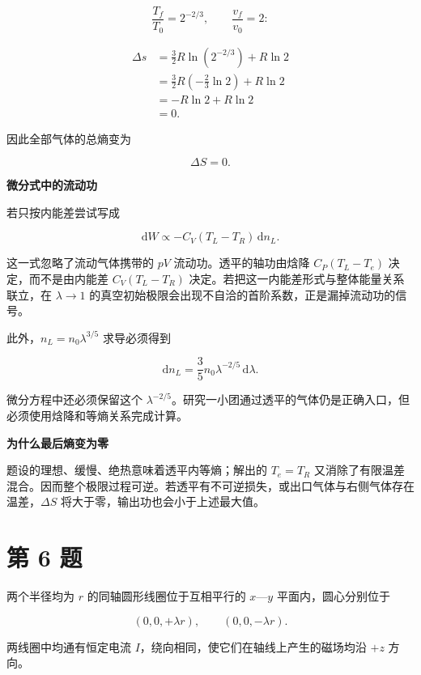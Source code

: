 \documentclass[12pt,a4paper,UTF8]{ctexart}
\begin{document}
\[
\frac{T_f}{T_0}=2^{-2/3},
\qquad
\frac{v_f}{v_0}=2:
\]

\[
\begin{aligned}
\Delta s
&=\frac32R\ln(2^{-2/3})+R\ln2\\
&=\frac32R\left(-\frac23\ln2\right)+R\ln2\\
&=-R\ln2+R\ln2\\
&=0.
\end{aligned}
\]

因此全部气体的总熵变为

\[\boxed{\Delta S=0}.\]

\textbf{微分式中的流动功}

若只按内能差尝试写成

\[\mathrm{d}W\propto-C_V(T_L-T_R)\,\mathrm{d}n_L.\]

这一式忽略了流动气体携带的 \(pV\) 流动功。透平的轴功由焓降
\(C_P(T_L-T_e)\) 决定，而不是由内能差 \(C_V(T_L-T_R)\)
决定。若把这一内能差形式与整体能量关系联立，在 \(\lambda\to1\)
的真空初始极限会出现不自洽的首阶系数，正是漏掉流动功的信号。

此外，\(n_L=n_0\lambda^{3/5}\) 求导必须得到

\[\mathrm{d}n_L=\frac35n_0\lambda^{-2/5}\,\mathrm{d}\lambda.\]

微分方程中还必须保留这个
\(\lambda^{-2/5}\)。研究一小团通过透平的气体仍是正确入口，但必须使用焓降和等熵关系完成计算。

\textbf{为什么最后熵变为零}

题设的理想、缓慢、绝热意味着透平内等熵；解出的 \(T_e=T_R\)
又消除了有限温差混合。因而整个极限过程可逆。若透平有不可逆损失，或出口气体与右侧气体存在温差，\(\Delta S\)
将大于零，输出功也会小于上述最大值。

\newpage

\section{第 6 题}\label{ux7b2c-6-ux9898}

两个半径均为 \(r\) 的同轴圆形线圈位于互相平行的 \(x\)---\(y\)
平面内，圆心分别位于

\[
(0,0,+\lambda r),
\qquad
(0,0,-\lambda r).
\]

两线圈中均通有恒定电流 \(I\)，绕向相同，使它们在轴线上产生的磁场均沿
\(+z\) 方向。
\end{document}
